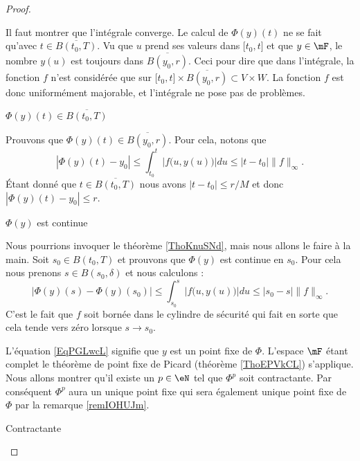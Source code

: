 \begin{proof}
\begin{subproof}
\begin{subproof}
        Il faut montrer que l'intégrale converge. Le calcul de \( \Phi(y)(t)\) ne se fait qu'avec \( t\in \overline{ B(t_0,T) }\). Vu que \( u\) prend ses valeurs dans \( \mathopen[ t_0 , t \mathclose]\) et que \( y\in\mF\), le nombre \( y(u)\) est toujours dans \( \overline{ B(y_0,r) }\). Ceci pour dire que dans l'intégrale, la fonction \( f\) n'est considérée que sur \( \mathopen[ t_0 , t \mathclose]\times \overline{ B(y_0,r) }\subset V\times W\). La fonction \( f\) est donc uniformément majorable, et l'intégrale ne pose pas de problèmes.

    \item[\( \Phi(y)(t)\in \overline{ B(t_0,T) }\)]

    Prouvons que \( \Phi(y)(t)\in\overline{ B(y_0,r) }\). Pour cela, notons que
    \begin{equation}
        | \Phi(y)(t)-y_0 |\leq \int_{t_0}^t |f\big( u,y(u) \big)|du\leq | t-t_0 |\| f \|_{\infty}.
    \end{equation}
    Étant donné que \( t\in\overline{ B(t_0,T) }\) nous avons \( | t-t_0 |\leq r/M\) et donc \( | \Phi(y)(t)-y_0 |\leq r\).

    \item[\( \Phi(y)\) est continue]

        Nous pourrions invoquer le théorème \ref{ThoKnuSNd}, mais nous allons le faire à la main. Soit \( s_0\in B(t_0,T)\) et prouvons que \( \Phi(y)\) est continue en \( s_0\). Pour cela nous prenons \( s\in B(s_0,\delta)\) et nous calculons :
        \begin{equation}
            | \Phi(y)(s)-\Phi(y)(s_0) |\leq \int_{s_0}^s|f\big( u,y(u) \big)|du\leq | s_0-s |\| f \|_{\infty}.
        \end{equation}
        C'est le fait que \( f\) soit bornée dans le cylindre de sécurité qui fait en sorte que cela tende vers zéro lorsque \( s\to s_0\).
    \end{subproof}


    
    L'équation \eqref{EqPGLwcL} signifie que \( y\) est un point fixe de \( \Phi\). L'espace \( \mF\) étant complet le théorème de point fixe de Picard (théorème \ref{ThoEPVkCL}) s'applique. Nous allons montrer qu'il existe un \( p\in\eN\) tel que \( \Phi^p\) soit contractante. Par conséquent \( \Phi^p\) aura un unique point fixe qui sera également unique point fixe de \( \Phi\) par la remarque \ref{remIOHUJm}.
    
\item[Contractante]


\end{subproof}
\end{proof}

